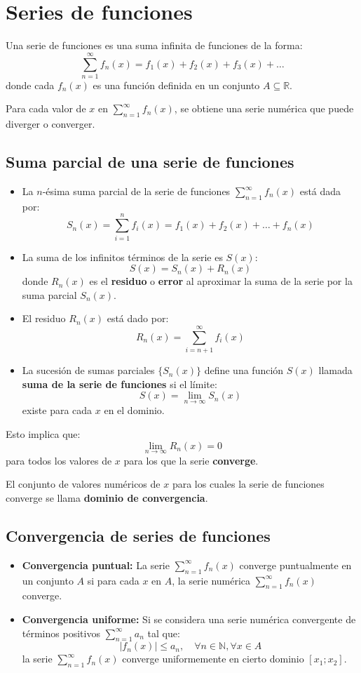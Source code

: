 \documentclass[a4paper,12pt]{article}
\begin{document}
\section{Series de funciones}
Una serie de funciones es una suma infinita de funciones de la forma:
$$ \sum_{n=1}^{\infty} f_n(x) = f_1(x) + f_2(x) + f_3(x) + \dots $$
donde cada $f_n(x)$ es una función definida en un conjunto $A \subseteq \mathbb{R}$. \newline

Para cada valor de $x$ en $\sum_{n=1}^{\infty} f_n(x)$, se obtiene una serie numérica que puede diverger o converger.

\subsection{Suma parcial de una serie de funciones}
\begin{itemize}
    \item La $n$-ésima suma parcial de la serie de funciones $\sum_{n=1}^{\infty} f_n(x)$ está dada por:
    $$ S_n(x) = \sum_{i=1}^{n} f_i(x) = f_1(x) + f_2(x) + \dots + f_n(x) $$
    \item La suma de los infinitos términos de la serie es $S(x)$:
    $$S(x) = S_n(x) + R_n(x)$$
    donde $R_n(x)$ es el \textbf{residuo} o \textbf{error} al aproximar la suma de la serie por la suma parcial $S_n(x)$.
    \item El residuo $R_n(x)$ está dado por:
    $$ R_n(x) = \sum_{i=n+1}^{\infty} f_i(x) $$
    \item La sucesión de sumas parciales $\{S_n(x)\}$ define una función $S(x)$ llamada \textbf{suma de la serie de funciones} si el límite:
    $$ S(x) = \lim_{n \to \infty} S_n(x) $$
    existe para cada $x$ en el dominio.
\end{itemize}

\begin{tcolorbox}
    Esto implica que:
$$\lim_{n \to \infty} R_n(x) = 0$$
para todos los valores de $x$ para los que la serie \textbf{converge}. \newline

El conjunto de valores numéricos de $x$ para los cuales la serie de funciones converge se llama \textbf{dominio de convergencia}.
\end{tcolorbox}

\subsection{Convergencia de series de funciones}
\begin{itemize}
    \item \textbf{Convergencia puntual:} La serie $\sum_{n=1}^{\infty} f_n(x)$ converge puntualmente en un conjunto $A$ si para cada $x$ en $A$, la serie numérica $\sum_{n=1}^{\infty} f_n(x)$ converge.
    \item \textbf{Convergencia uniforme:} Si se considera una serie numérica convergente de términos positivos $\sum_{n=1}^{\infty} a_n$ tal que:
    $$ |f_n(x)| \leqslant a_n, \quad \forall n \in \mathbb{N}, \forall x \in A $$
    la serie $\sum_{n=1}^{\infty} f_n(x)$ converge uniformemente en cierto dominio $[x_1; x_2]$.
\end{itemize}
\end{document}
